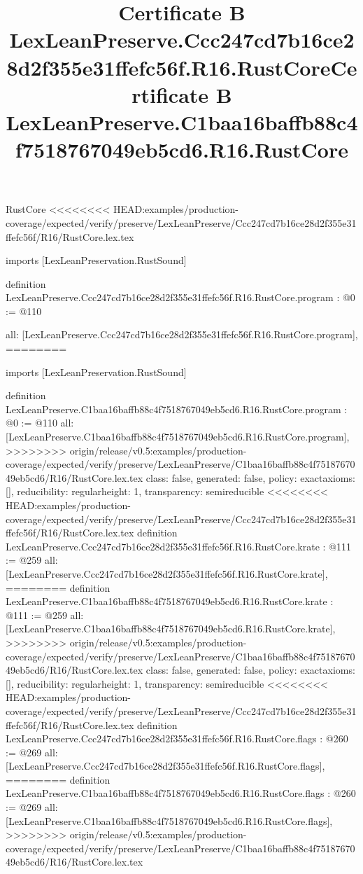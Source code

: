 \begin{lexlean}{RustCore}
<<<<<<<< HEAD:examples/production-coverage/expected/verify/preserve/LexLeanPreserve/Ccc247cd7b16ce28d2f355e31ffefc56f/R16/RustCore.lex.tex
\title{Certificate B LexLeanPreserve.Ccc247cd7b16ce28d2f355e31ffefc56f.R16.RustCore}
\begin{coremodule}
imports [LexLeanPreservation.RustSound]

definition LexLeanPreserve.Ccc247cd7b16ce28d2f355e31ffefc56f.R16.RustCore.program : @0 := @110 {
  all: [LexLeanPreserve.Ccc247cd7b16ce28d2f355e31ffefc56f.R16.RustCore.program],
========
\title{Certificate B LexLeanPreserve.C1baa16baffb88c4f7518767049eb5cd6.R16.RustCore}
\begin{coremodule}
imports [LexLeanPreservation.RustSound]

definition LexLeanPreserve.C1baa16baffb88c4f7518767049eb5cd6.R16.RustCore.program : @0 := @110 {
  all: [LexLeanPreserve.C1baa16baffb88c4f7518767049eb5cd6.R16.RustCore.program],
>>>>>>>> origin/release/v0.5:examples/production-coverage/expected/verify/preserve/LexLeanPreserve/C1baa16baffb88c4f7518767049eb5cd6/R16/RustCore.lex.tex
  class: false,
  generated: false,
  policy: exact{axioms: []},
  reducibility: regular{height: 1},
  transparency: semireducible
}
<<<<<<<< HEAD:examples/production-coverage/expected/verify/preserve/LexLeanPreserve/Ccc247cd7b16ce28d2f355e31ffefc56f/R16/RustCore.lex.tex
definition LexLeanPreserve.Ccc247cd7b16ce28d2f355e31ffefc56f.R16.RustCore.krate : @111 := @259 {
  all: [LexLeanPreserve.Ccc247cd7b16ce28d2f355e31ffefc56f.R16.RustCore.krate],
========
definition LexLeanPreserve.C1baa16baffb88c4f7518767049eb5cd6.R16.RustCore.krate : @111 := @259 {
  all: [LexLeanPreserve.C1baa16baffb88c4f7518767049eb5cd6.R16.RustCore.krate],
>>>>>>>> origin/release/v0.5:examples/production-coverage/expected/verify/preserve/LexLeanPreserve/C1baa16baffb88c4f7518767049eb5cd6/R16/RustCore.lex.tex
  class: false,
  generated: false,
  policy: exact{axioms: []},
  reducibility: regular{height: 1},
  transparency: semireducible
}
<<<<<<<< HEAD:examples/production-coverage/expected/verify/preserve/LexLeanPreserve/Ccc247cd7b16ce28d2f355e31ffefc56f/R16/RustCore.lex.tex
definition LexLeanPreserve.Ccc247cd7b16ce28d2f355e31ffefc56f.R16.RustCore.flags : @260 := @269 {
  all: [LexLeanPreserve.Ccc247cd7b16ce28d2f355e31ffefc56f.R16.RustCore.flags],
========
definition LexLeanPreserve.C1baa16baffb88c4f7518767049eb5cd6.R16.RustCore.flags : @260 := @269 {
  all: [LexLeanPreserve.C1baa16baffb88c4f7518767049eb5cd6.R16.RustCore.flags],
>>>>>>>> origin/release/v0.5:examples/production-coverage/expected/verify/preserve/LexLeanPreserve/C1baa16baffb88c4f7518767049eb5cd6/R16/RustCore.lex.tex
}}}
\end{coremodule}}
\end{coremodule}
\end{lexlean}
